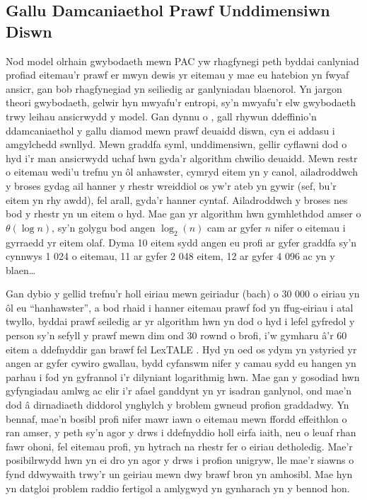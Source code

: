 \subsection{Gallu Damcaniaethol Prawf Unddimensiwn Diswn}
Nod model olrhain gwybodaeth mewn PAC yw rhagfynegi peth byddai canlyniad profiad eitemau'r prawf er mwyn dewis yr eitemau y mae eu hatebion yn fwyaf ansicr, gan bob rhagfynegiad yn seiliedig ar ganlyniadau blaenorol. Yn jargon theori gwybodaeth, gelwir hyn mwyafu'r entropi, sy'n mwyafu'r elw gwybodaeth trwy leihau ansicrwydd y model. Gan dynnu o \textcite{shannon_mathematical_1948}, gall rhywun ddeffinio'n ddamcaniaethol y gallu diamod mewn prawf deuaidd diswn, cyn ei addasu i amgylchedd swnllyd. Mewn graddfa syml, unddimensiwn, gellir cyflawni dod o hyd i'r man ansicrwydd uchaf hwn gyda'r algorithm chwilio deuaidd. Mewn restr o eitemau wedi'u trefnu yn ôl anhawster, cymryd eitem yn y canol, ailadroddwch y broses gydag ail hanner y rhestr wreiddiol os yw'r ateb yn gywir (sef, bu'r eitem yn rhy awdd), fel arall, gyda'r hanner cyntaf. Ailadroddwch y broses nes bod y rhestr yn un eitem o hyd. Mae gan yr algorithm hwn gymhlethdod amser o $\theta(\log{n})$, sy'n golygu bod angen $\log_2(n)$ cam ar gyfer $n$ nifer o eitemau i gyrraedd yr eitem olaf. Dyma 10 eitem sydd angen eu profi ar gyfer graddfa sy'n cynnwys 1 024 o eitemau, 11 ar gyfer 2 048 eitem, 12 ar gyfer 4 096 ac yn y blaen\ldots

Gan dybio y gellid trefnu'r holl eiriau mewn geiriadur (bach) o 30 000 o eiriau yn ôl eu ``hanhawster'', a bod rhaid i hanner eitemau prawf fod yn ffug-eiriau i atal twyllo, byddai prawf seiledig ar yr algorithm hwn yn dod o hyd i lefel gyfredol y person sy'n sefyll y prawf mewn dim ond 30 rownd o brofi, i'w gymharu â'r 60 eitem a ddefnyddir gan brawf fel LexTALE \parencite{lemhofer_introducing_2012}. Hyd yn oed os ydym yn ystyried yr angen ar gyfer cywiro gwallau, bydd cyfanswm nifer y camau sydd eu hangen yn parhau i fod yn gyfrannol i'r dilyniant logarithmig hwn. Mae gan y gosodiad hwn gyfyngiadau amlwg ac elir i'r afael ganddynt yn yr isadran ganlynol, ond mae'n dod â dirnadiaeth diddorol ynghylch y broblem gwneud profion graddadwy. Yn bennaf, mae'n bosibl profi nifer mawr iawn o eitemau mewn ffordd effeithlon o ran amser, y peth sy'n agor y drws i ddefnyddio holl eirfa iaith, neu o leuaf rhan fawr ohoni, fel eitemau profi, yn hytrach na rhestr fer o eiriau detholedig. Mae'r posibilrwydd hwn yn ei dro yn agor y drws i profion unigryw, lle mae'r siawns o fynd ddwywaith trwy'r un geiriau mewn dwy brawf bron yn amhosibl. Mae hyn yn datgloi problem raddio fertigol a amlygwyd yn gynharach yn y bennod hon.


